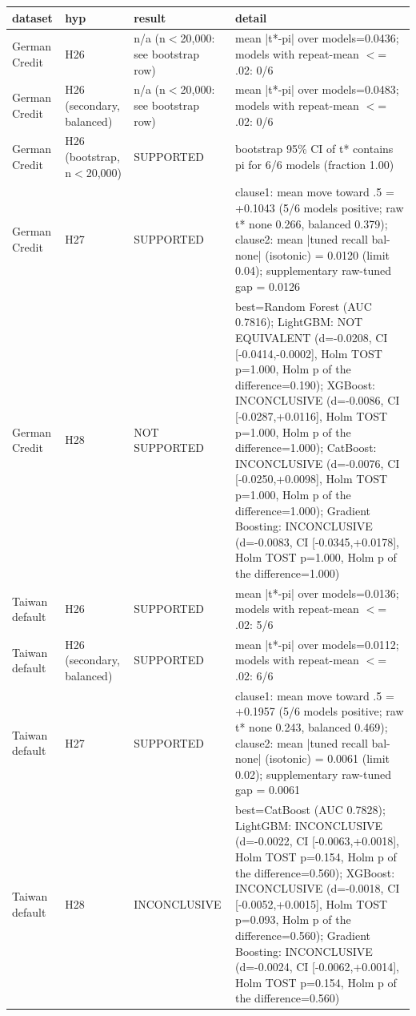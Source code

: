 \begin{tabular}{lllp{5.2cm}}
\toprule
dataset & hyp & result & detail \\
\midrule
German Credit & H26 & n/a (n$<$20,000: see bootstrap row) & mean |t*-pi| over models=0.0436; models with repeat-mean $<$= .02: 0/6 \\
German Credit & H26 (secondary, balanced) & n/a (n$<$20,000: see bootstrap row) & mean |t*-pi| over models=0.0483; models with repeat-mean $<$= .02: 0/6 \\
German Credit & H26 (bootstrap, n$<$20,000) & SUPPORTED & bootstrap 95\% CI of t* contains pi for 6/6 models (fraction 1.00) \\
German Credit & H27 & SUPPORTED & clause1: mean move toward .5 = +0.1043 (5/6 models positive; raw t* none 0.266, balanced 0.379); clause2: mean |tuned recall bal-none| (isotonic) = 0.0120 (limit 0.04); supplementary raw-tuned gap = 0.0126 \\
German Credit & H28 & NOT SUPPORTED & best=Random Forest (AUC 0.7816); LightGBM: NOT EQUIVALENT (d=-0.0208, CI [-0.0414,-0.0002], Holm TOST p=1.000, Holm p of the difference=0.190); XGBoost: INCONCLUSIVE (d=-0.0086, CI [-0.0287,+0.0116], Holm TOST p=1.000, Holm p of the difference=1.000); CatBoost: INCONCLUSIVE (d=-0.0076, CI [-0.0250,+0.0098], Holm TOST p=1.000, Holm p of the difference=1.000); Gradient Boosting: INCONCLUSIVE (d=-0.0083, CI [-0.0345,+0.0178], Holm TOST p=1.000, Holm p of the difference=1.000) \\
Taiwan default & H26 & SUPPORTED & mean |t*-pi| over models=0.0136; models with repeat-mean $<$= .02: 5/6 \\
Taiwan default & H26 (secondary, balanced) & SUPPORTED & mean |t*-pi| over models=0.0112; models with repeat-mean $<$= .02: 6/6 \\
Taiwan default & H27 & SUPPORTED & clause1: mean move toward .5 = +0.1957 (5/6 models positive; raw t* none 0.243, balanced 0.469); clause2: mean |tuned recall bal-none| (isotonic) = 0.0061 (limit 0.02); supplementary raw-tuned gap = 0.0061 \\
Taiwan default & H28 & INCONCLUSIVE & best=CatBoost (AUC 0.7828); LightGBM: INCONCLUSIVE (d=-0.0022, CI [-0.0063,+0.0018], Holm TOST p=0.154, Holm p of the difference=0.560); XGBoost: INCONCLUSIVE (d=-0.0018, CI [-0.0052,+0.0015], Holm TOST p=0.093, Holm p of the difference=0.560); Gradient Boosting: INCONCLUSIVE (d=-0.0024, CI [-0.0062,+0.0014], Holm TOST p=0.154, Holm p of the difference=0.560) \\
\bottomrule
\end{tabular}
